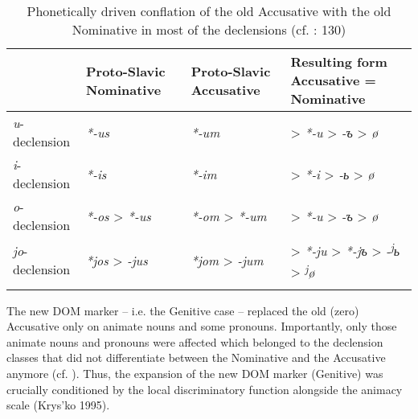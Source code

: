 \documentclass[output=paper]{langsci/langscibook}
\begin{document}
\begin{table}
\begin{tabularx}{\textwidth}{lp{2.3cm}p{2.3cm}Q}
\lsptoprule
\bfseries ~ & \bfseries Proto-Slavic Nominative & \bfseries Proto-Slavic Accusative & {\bfseries Resulting form}
\bfseries Accusative = Nominative\\
\midrule
\textit{u}{}-declension & \textit{*-us} & \textit{*-um} & > \textit{*-u} > \textit{-{ъ}} > \textit{ø}\\
\textit{i}{}-declension & \textit{*-is} & \textit{*-im} & > \textit{*-i} > \textit{-{ь}} > \textit{ø}\\
\textit{o}{}-declension & \textit{*-os} > \textit{*-us} & \textit{*-om} > \textit{*-um} & > \textit{*-u} > \textit{-{ъ}} > \textit{ø}\\
\textit{jo}{}-declension & \textit{*jos} > \textit{-jus} & \textit{*jom} > \textit{-jum} & > \textit{*-ju} > \textit{*}\textit{{}-j}\textit{{ъ} }> \textit{-\textsuperscript{j}}\textit{{ь}} > \textit{\textsuperscript{j}}\textit{ø}\\
\lspbottomrule
\end{tabularx}

\caption{Phonetically driven conflation of the old Accusative with the old Nominative in most of the declensions (cf. \citealt{Arumaa1985}: 130)}
\label{tab:serzant:1}
\end{table}

The new DOM marker – i.e. the Genitive case – replaced the old (zero) Accusative only on animate nouns and some pronouns. Importantly, only those animate nouns and pronouns were affected which belonged to the declension classes that did not differentiate between the Nominative and the Accusative anymore (cf. ). Thus, the expansion of the new DOM marker (Genitive) was crucially conditioned by the local discriminatory function alongside the animacy scale (Krys’ko 1995). 
\end{document}
